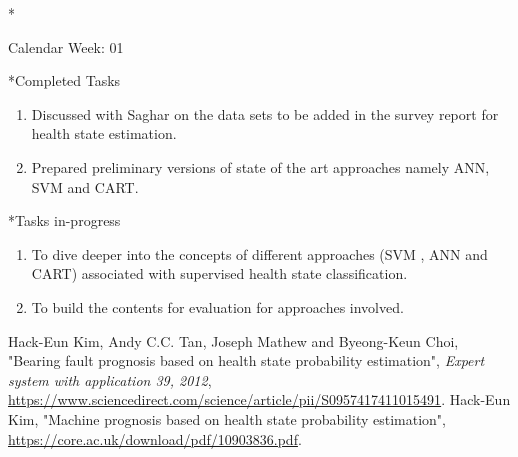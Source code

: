 \documentclass[11pt,a4paper]{article}
\begin{document}
\begin{section}*{Calendar Week: 01 \hfill \date{10 January, 2021}}

\begin{subsection}*{Completed Tasks}
    \begin{enumerate}
        \item 
            Discussed with Saghar on the data sets to be added in the survey report for health state estimation.
        \item
            Prepared preliminary versions of state of the art approaches namely ANN, SVM and CART.
    \end{enumerate}
\end{subsection}
\begin{subsection}*{Tasks in-progress}
    \begin{enumerate}
        \item
            To dive deeper into the concepts of  different approaches (SVM , ANN and CART) associated with supervised health state classification.
        \item
            To build the contents for evaluation for approaches involved.
        \end{enumerate}
\end{subsection}
\begin{thebibliography}{9}
    {Hack-Eun Kim,  Andy C.C. Tan, Joseph Mathew  and  Byeong-Keun Choi},
    "Bearing fault prognosis based on health state probability estimation",
    \textit{Expert system with application 39, 2012},
    \href{https://www.sciencedirect.com/science/article/pii/S0957417411015491}{https://www.sciencedirect.com/science/article/pii/S0957417411015491}.
    {Hack-Eun Kim},
    "Machine prognosis based on health state probability estimation",
    \href{https://core.ac.uk/download/pdf/10903836.pdf}{https://core.ac.uk/download/pdf/10903836.pdf}.
    \end{thebibliography}
\end{section}
\newpage
\end{document}
